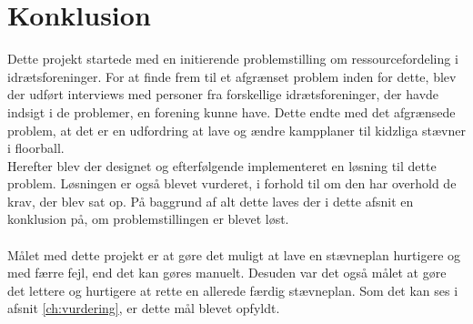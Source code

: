 \chapter{Konklusion}\label{ch:conclusion}

Dette projekt startede med en initierende problemstilling om ressourcefordeling i idrætsforeninger. For at finde frem til et afgrænset problem inden for dette, blev der udført interviews med personer fra forskellige idrætsforeninger, der havde indsigt i de problemer, en forening kunne have. Dette endte med det afgrænsede problem, at det er en udfordring at lave og ændre kampplaner til kidzliga stævner i floorball. 
\\
Herefter blev der designet og efterfølgende implementeret en løsning til dette problem. Løsningen er også blevet vurderet, i forhold til om den har overhold de krav, der blev sat op. 
På baggrund af alt dette laves der i dette afsnit en konklusion på, om problemstillingen er blevet løst.
\\\\
Målet med dette projekt er at gøre det muligt at lave en stævneplan hurtigere og med færre fejl, end det kan gøres manuelt. Desuden var det også målet at gøre det lettere og hurtigere at rette en allerede færdig stævneplan. Som det kan ses i afsnit \ref{ch:vurdering}, er dette mål blevet opfyldt.
\\\\

